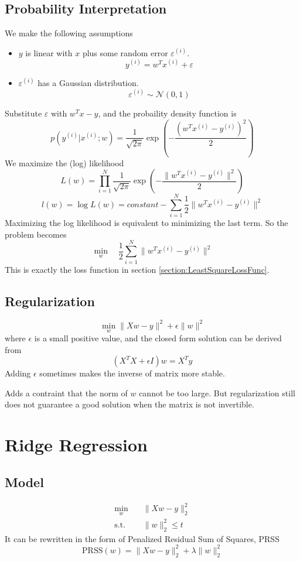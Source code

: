 \subsection{Probability Interpretation}\label{section:LeastSquareProbability}
We make the following assumptions
\begin{itemize}
    \item $y$ is linear with $x$ plus some random error $\varepsilon^{(i)}$.
    \[ y^{(i)} = w^Tx^{(i)} + \varepsilon \]
    \item $\varepsilon^{(i)}$ has a Gaussian distribution.
    \[ \varepsilon^{(i)} \sim \mathcal{N}(0,1) \]
\end{itemize}
Substitute $\varepsilon$ with $w^Tx-y$, and the probaility density function is
\[ p(y^{(i)}|x^{(i)};w) = \frac{1}{\sqrt{2\pi}}\exp\left(-\frac{(w^Tx^{(i)}-y^{(i)})^2}{2}\right) \]
We maximize the (log) likelihood
\[ L(w) = \prod_{i=1}^N \frac{1}{\sqrt{2\pi}}\exp\left(-\frac{\|w^Tx^{(i)}-y^{(i)}\|^2}{2}\right) \]
\[ l(w) = \log L(w) = constant - \sum_{i=1}^N \frac{1}{2}\|w^Tx^{(i)}-y^{(i)}\|^2\]
Maximizing the log likelihood is equivalent to minimizing the last term. So the problem becomes
\[ \min_{w} \quad \frac{1}{2}\sum_{i=1}^N\|w^Tx^{(i)} - y^{(i)}\|^2 \]
This is exactly the loss function in section \ref{section:LeastSquareLossFunc}.
\subsection{Regularization}
\[ \min_w \| Xw - y \|^2 + \epsilon\|w\|^2 \]
where $\epsilon$ is a small positive value, and the closed form solution can be derived from
\[ (X^TX + \epsilon I)w = X^Ty \]
Adding $\epsilon$ sometimes makes the inverse of matrix more stable.
\begin{remark}
    Adds a contraint that the norm of $w$ cannot be too large. But regularization still does not guarantee a good solution when the matrix is not invertible.
\end{remark}

\section{Ridge Regression}
\subsection{Model}
\begin{align*}
    \min_w \quad &\| Xw - y \|_2^2 \\
    \text{s.t.} \quad &\|w\|_2^2 \le t
\end{align*}
It can be rewritten in the form of Penalized Residual Sum of Squares, PRSS
\[ \textrm{PRSS}(w) = \|Xw-y\|_2^2 + \lambda\|w\|_2^2 \]

